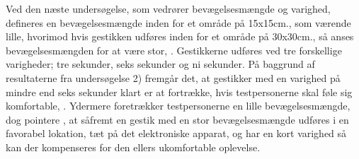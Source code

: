 Ved den næste undersøgelse, som vedrører bevægelsesmængde og varighed, defineres en bevægelsesmængde inden for et område på 15x15cm., som værende lille, hvorimod hvis gestikken udføres inden for et område på 30x30cm., så anses bevægelsesmængden for at være stor, \parencite[s. 198]{PDF:AreYouComfortableDoingThat}. Gestikkerne udføres ved tre forskellige varigheder; tre sekunder, seks sekunder og ni sekunder. På baggrund af resultaterne fra undersøgelse 2) fremgår det, at gestikker med en varighed på mindre end seks sekunder klart er at fortrække, hvis testpersonerne skal føle sig komfortable, \parencite[s. 199]{PDF:AreYouComfortableDoingThat}. Ydermere foretrækker testpersonerne en lille bevægelsesmængde, dog pointere \textcite[s. 199]{PDF:AreYouComfortableDoingThat}, at såfremt en gestik med en stor bevægelsesmængde udføres i en favorabel lokation, tæt på det elektroniske apparat, og har en kort varighed så kan der kompenseres for den ellers ukomfortable oplevelse. 

